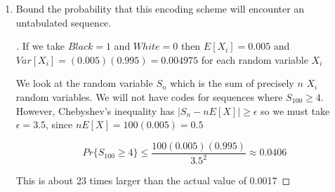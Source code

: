 \documentclass[]{book}
\theoremstyle{definition}
\begin{document}
\begin{enumerate}
\begin{proof}[\unskip\nopunct]










\end{proof}

\item	Bound the probability that this encoding scheme will encounter an untabulated sequence.

\begin{proof}[\unskip\nopunct]
		
If we take $Black = 1$ and $White = 0$ then $E[X_{i}] = 0.005$ and $Var[X_{i}] = (0.005)(0.995) = 0.004975$ for each random variable $X_{i}$

We look at the random variable $S_{n}$ which is the sum of precisely $n$  $X_{i}$ random variables. We will not have codes for sequences where $S_{100} \geq 4$. However, Chebyshev's inequality has $|S_{n} - nE[X]| \geq \epsilon$ so we must take $\epsilon = 3.5$, since $nE[X] = 100(0.005) = 0.5$

$$Pr\{S_{100} \geq 4\} \leq \dfrac{100(0.005)(0.995)}{3.5^{2}} \approx 0.0406$$

This is about 23 times larger than the actual value of 0.0017

\end{proof}

\end{enumerate}
\end{document}

